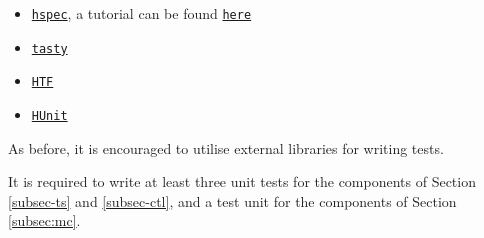 \documentclass{article}
\begin{document}
\begin{itemize}
\item \href{https://hackage.haskell.org/package/hspec}{\texttt{hspec}}, a tutorial can be found \href{https://hspec.github.io/}{\texttt{here}}
\item \href{https://hackage.haskell.org/package/tasty}{\texttt{tasty}}
\item \href{https://hackage.haskell.org/package/HTF}{\texttt{HTF}}
\item \href{https://hackage.haskell.org/package/HUnit}{\texttt{HUnit}}
\end{itemize}

As before, it is encouraged to utilise external libraries for writing tests.

It is required to write at least three unit tests for the components of
Section \ref{subsec-ts} and \ref{subsec-ctl}, and a test unit for the
components of Section \ref{subsec:mc}.
\end{document}
